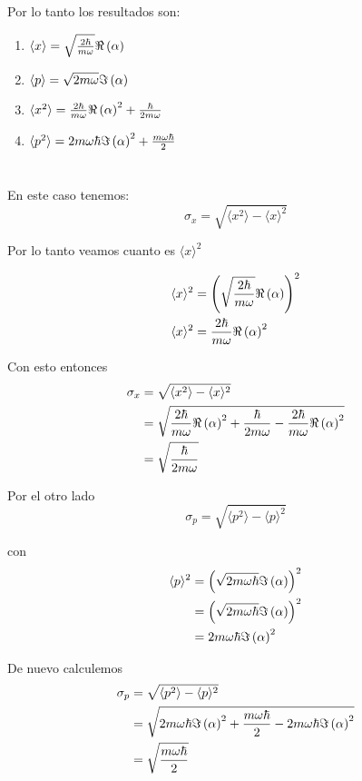 \documentclass{report}
\newcommand{\inangle}[1]{\langle#1\rangle}
\begin{document}
Por lo tanto los resultados son:
\begin{enumerate}
  \item $\langle x \rangle = \sqrt{\frac{2\hbar}{m\omega}} \Re\left(\alpha\right)$
  \item $\langle p \rangle = \sqrt{2 m\omega}\Im\left(\alpha\right)$
  \item $\langle x^2 \rangle = \frac{2\hbar}{m\omega}\Re \left(\alpha\right)^2 + \frac{\hbar}{2m\omega}$
  \item $\langle p^2 \rangle = 2m\omega\hbar\Im\left(\alpha\right)^2 + \frac{m\omega\hbar}{2}$
\end{enumerate}

\pagebreak

\section{}

En este caso tenemos:
\[
  \sigma_x = \sqrt{\inangle{x^2} - \inangle{x}^2}
\]

Por lo tanto veamos cuanto es $\inangle{x}^2$

\begin{align*}
  \inangle{x}^2 &= \paren{\sqrt{\frac{2\hbar}{m\omega}} \Re\paren{\alpha}}^2\\
  \inangle{x}^2 &= \frac{2\hbar}{m\omega} \Re\paren{\alpha}^2
\end{align*}

Con esto entonces
\begin{align*}
  \sigma_x &= \sqrt{\inangle{x^2} - \inangle{x}^2}\\
  &= \sqrt{\frac{2\hbar}{m\omega}\Re \paren{\alpha}^2 + \frac{\hbar}{2m\omega} - \frac{2\hbar}{m\omega} \Re\paren{\alpha}^2}\\
  &= \sqrt{\frac{\hbar}{2m\omega}}
\end{align*}

Por el otro lado
\[
  \sigma_p = \sqrt{\inangle{p^2} - \inangle{p}^2}
\]

con
\begin{align*}
  \inangle{p}^2 &= \paren{\sqrt{2 m\omega\hbar}\Im\paren{\alpha}}^2\\
   &= \paren{\sqrt{2 m\omega\hbar}\Im\paren{\alpha}}^2\\
   &= 2 m\omega\hbar\Im\paren{\alpha}^2\\
\end{align*}

De nuevo calculemos
\begin{align*}
  \sigma_p &= \sqrt{\inangle{p^2} - \inangle{p}^2}\\
  &= \sqrt{2m\omega\hbar\Im\paren{\alpha}^2 + \frac{m\omega\hbar}{2} - 2 m\omega\hbar\Im\paren{\alpha}^2}\\
  &= \sqrt{\frac{m\omega\hbar}{2}}
\end{align*}
\end{document}
